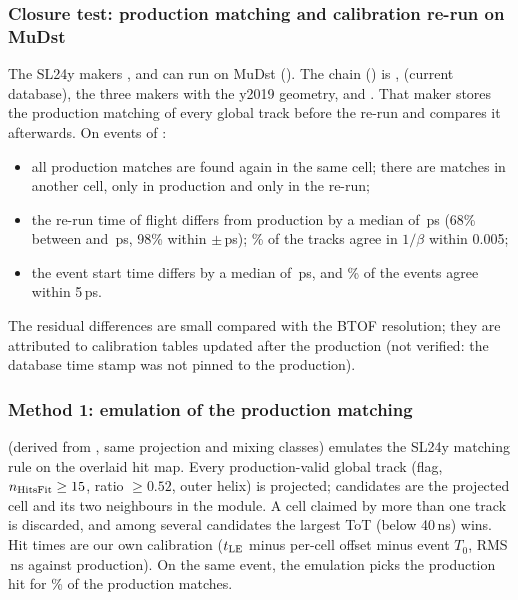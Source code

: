 \subsubsection{Closure test: production matching and calibration re-run on MuDst}
\label{sec:muclos}
The SL24y makers ,  and  can run on MuDst
(). The chain () is ,  (current
database), the three makers with the y2019 geometry, and . That maker stores the
production matching of every global track before the re-run and compares it afterwards.
On \clEvents{} events of :
\begin{itemize}
\item all \clNSame{} production matches are found again in the same cell; there are \clNOther{} matches in another cell,
  \clNOnlyProd{} only in production and \clNOnlyRerun{} only in the re-run;
\item the re-run time of flight differs from production by a median of \clDtofMed\,ps (68\% between \clDtofLo{} and
  \clDtofHi\,ps, 98\% within $\pm$\clDtofNinetyEight\,ps); \clDbetaCore\% of the tracks agree in $1/\beta$ within 0.005;
\item the event start time differs by a median of \clDtsMed\,ps, and \clDtsSame\% of the events agree within 5\,ps.
\end{itemize}
The residual differences are small compared with the BTOF resolution; they are attributed to calibration tables updated
after the production (not verified: the database time stamp was not pinned to the production).


\subsubsection{Method 1: emulation of the production matching}
\label{sec:muemul}
 (derived from , same projection and mixing classes) emulates the SL24y
matching rule on the overlaid hit map. Every production-valid global track (flag, $n_{\rm HitsFit}\ge15$, ratio $\ge0.52$,
outer helix) is projected; candidates are the projected cell and its two neighbours in the module. A cell claimed by more
than one track is discarded, and among several candidates the largest ToT (below 40\,ns) wins. Hit times are our own
calibration ($t_{\rm LE}$ minus per-cell offset minus event $T_0$, RMS \muCalRMS\,ns against production). On the same event,
the emulation picks the production hit for \muChoiceSame\% of the production matches.

